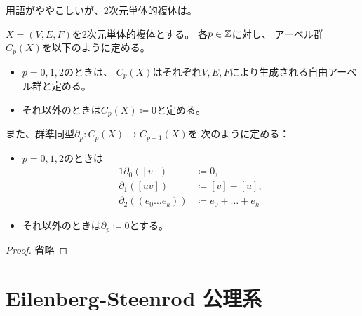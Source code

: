 \documentclass[report]{jlreq}
\begin{document}
用語がややこしいが、2次元単体的複体は。

\begin{definition}[頂点・辺・面の記法]
    \TODO{}
\end{definition}

\begin{definition}[2次元単体的複体から定まるチェイン複体]
    $X = (V, E, F)$を2次元単体的複体とする。
    各$p \in \mathbb{Z}$に対し、
    アーベル群$C_p(X)$を以下のように定める。
    \begin{itemize}
        \item $p = 0, 1, 2$のときは、
            $C_p(X)$はそれぞれ$V, E, F$により生成される自由アーベル群と定める。
        \item それ以外のときは$C_p(X) \coloneqq 0$と定める。
    \end{itemize}
    また、群準同型$\partial_p \colon C_p(X) \to C_{p-1}(X)$を
    次のように定める：
    \begin{itemize}
        \item $p = 0, 1, 2$のときは
            \begin{alignat}{1}
                \partial_0([v]) &\coloneqq 0, \\
                \partial_1([uv]) &\coloneqq [v] - [u], \\
                \partial_2((e_0 \dots e_k)) &\coloneqq e_0 + \dots + e_k
            \end{alignat}
        \item それ以外のときは$\partial_p \coloneqq 0$とする。
    \end{itemize}
\end{definition}

\begin{theorem}[2次元単体的ホモロジーの細分による不変性]
    \TODO{}
\end{theorem}

\begin{proof}
    省略
\end{proof}

\begin{example}[2次元トーラス]
    \TODO{}
\end{example}

%
\section{Eilenberg-Steenrod 公理系}
\end{document}
